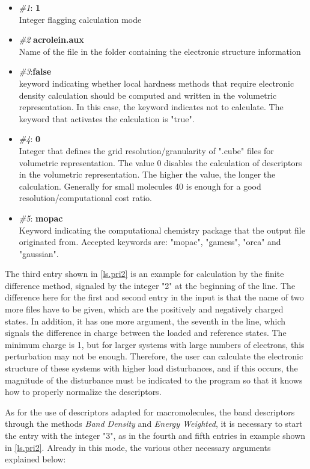 \documentclass[a4paper,11pt]{refart}
\begin{document}
\begin{itemize}
	\item \emph{\#1}: \textbf{1}\\
	Integer flagging calculation mode
	\item \emph{\#2} \textbf{acrolein.aux}\\
	Name of the file in the folder containing the electronic structure information
	\item \emph{\#3}:\textbf{false} \\
	keyword indicating whether local hardness methods that require electronic density calculation should be computed and written in the volumetric representation. In this case, the keyword indicates not to calculate. The keyword that activates the calculation is "true".
	\item \emph{\#4}: \textbf{0}\\
	Integer that defines the grid resolution/granularity of ".cube" files for volumetric representation. The value 0 disables the calculation of descriptors in the volumetric representation. The higher the value, the longer the calculation. Generally for small molecules 40 is enough for a good resolution/computational cost ratio.
	\item \emph{\#5}: \textbf{mopac}\\
	Keyword indicating the computational chemistry package that the output file originated from.
	Accepted keywords are: "mopac", "gamess", "orca" and "gaussian".
\end{itemize}

The third entry shown in \autoref{ls.pri2} is an example for calculation by the finite difference method, signaled by the integer "2" at the beginning of the line. The difference here for the first and second entry in the input is that the name of two more files have to be given, which are the positively and negatively charged states. In addition, it has one more argument, the seventh in the line, which signals the difference in charge between the loaded and reference states. The minimum charge is 1, but for larger systems with large numbers of electrons, this perturbation may not be enough. Therefore, the user can calculate the electronic structure of these systems with higher load disturbances, and if this occurs, the magnitude of the disturbance must be indicated to the program so that it knows how to properly normalize the descriptors.

As for the use of descriptors adapted for macromolecules, the band descriptors through the methods \textit{Band Density} and \textit{Energy Weighted}, it is necessary to start the entry with the integer "3", as in the fourth and fifth entries in example shown in \autoref{ls.pri2}. Already in this mode, the various other necessary arguments explained below:
\end{document}
